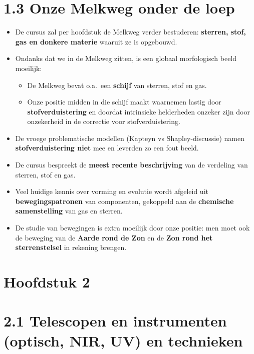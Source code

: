 \documentclass[10pt,a4paper]{article}
\begin{document}
\section*{1.3 Onze Melkweg onder de loep}
\begin{itemize}
  \item De cursus zal per hoofdstuk de Melkweg verder bestuderen: \textbf{sterren, stof, gas en donkere materie} waaruit ze is opgebouwd.
  \item Ondanks dat we in de Melkweg zitten, is een globaal morfologisch beeld moeilijk:
  \begin{itemize}
    \item De Melkweg bevat o.a.\ een \textbf{schijf} van sterren, stof en gas.
    \item Onze positie midden in die schijf maakt waarnemen lastig door \textbf{stofverduistering} en doordat intrinsieke helderheden onzeker zijn door onzekerheid in de correctie voor stofverduistering.
  \end{itemize}
  \item De vroege problematische modellen (Kapteyn vs Shapley-discussie) namen \textbf{stofverduistering niet} mee en leverden zo een fout beeld.
  \item De cursus bespreekt de \textbf{meest recente beschrijving} van de verdeling van sterren, stof en gas.
  \item Veel huidige kennis over vorming en evolutie wordt afgeleid uit \textbf{bewegingspatronen} van componenten, gekoppeld aan de \textbf{chemische samenstelling} van gas en sterren.
  \item De studie van bewegingen is extra moeilijk door onze positie: men moet ook de beweging van de \textbf{Aarde rond de Zon} en de \textbf{Zon rond het sterrenstelsel} in rekening brengen.
\end{itemize}

\section*{Hoofdstuk 2}
\section*{2.1 Telescopen en instrumenten (optisch, NIR, UV) en technieken}
\end{document}
